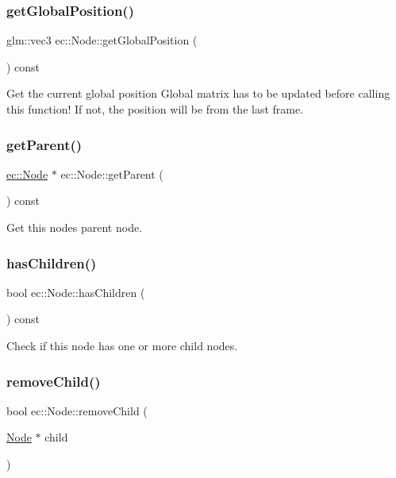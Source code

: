 \subsubsection{\texorpdfstring{get\+Global\+Position()}{getGlobalPosition()}}
{\footnotesize\ttfamily glm\+::vec3 ec\+::\+Node\+::get\+Global\+Position (\begin{DoxyParamCaption}{ }\end{DoxyParamCaption}) const}

Get the current global position Global matrix has to be updated before calling this function! If not, the position will be from the last frame. \mbox{\label{classec_1_1_node_ae1f93035b3df9db7a24afc06a7526dab}} 
\subsubsection{\texorpdfstring{get\+Parent()}{getParent()}}
{\footnotesize\ttfamily \mbox{\hyperlink{classec_1_1_node}{ec\+::\+Node}} $\ast$ ec\+::\+Node\+::get\+Parent (\begin{DoxyParamCaption}{ }\end{DoxyParamCaption}) const}

Get this node\textquotesingle{}s parent node. \mbox{\label{classec_1_1_node_ae1626b695c7c5f15af399772b51d0a5a}} 
\subsubsection{\texorpdfstring{has\+Children()}{hasChildren()}}
{\footnotesize\ttfamily bool ec\+::\+Node\+::has\+Children (\begin{DoxyParamCaption}{ }\end{DoxyParamCaption}) const}

Check if this node has one or more child nodes. \mbox{\label{classec_1_1_node_ab0d856da4064db916e6fd4f9ad1ecafb}} 
\subsubsection{\texorpdfstring{remove\+Child()}{removeChild()}}
{\footnotesize\ttfamily bool ec\+::\+Node\+::remove\+Child (\begin{DoxyParamCaption}\item[{\mbox{\hyperlink{classec_1_1_node}{Node}} $\ast$}]{child }\end{DoxyParamCaption})}


